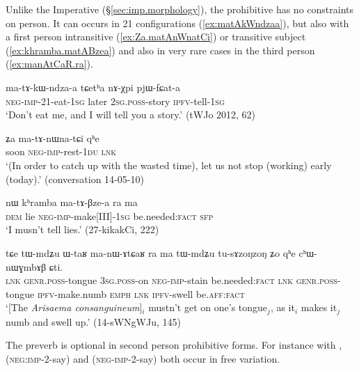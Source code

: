 Unlike the Imperative (§\ref{sec:imp.morphology}), the prohibitive has no constraints on person. It can occurs in 2\fl{}1 configurations (\ref{ex:matAkWndzaa}), but also with a first person intransitive (\ref{ex:Za.matAnWnatCi}) or transitive subject (\ref{ex:khramba.matABzea}) and also in very rare cases in the third person (\ref{ex:manAtCaR.ra}).

\begin{exe}
\ex  \label{ex:matAkWndzaa}
\gll ma-tɤ-kɯ-ndza-a tɕetʰa nɤ-χpi pjɯ-fɕat-a \\
\textsc{neg}-\textsc{imp}-2\fl{}1-eat-\textsc{1sg} later \textsc{2sg}.\textsc{poss}-story \textsc{ipfv}-tell-\textsc{1sg} \\
\glt `Don't eat me, and I will tell you a story.' (tWJo 2012, 62)
\end{exe}

\begin{exe}
\ex  \label{ex:Za.matAnWnatCi}
\gll ʑa ma-tɤ-nɯna-tɕi qʰe \\
soon \textsc{neg}-\textsc{imp}-rest-\textsc{1du} \textsc{lnk} \\
\glt `(In order to catch up with the wasted time), let us not stop (working) early (today).' (conversation 14-05-10)
\end{exe}

\begin{exe}
\ex  \label{ex:khramba.matABzea}
\gll nɯ kʰramba ma-tɤ-βze-a ra ma \\
\textsc{dem} lie  \textsc{neg}-\textsc{imp}-make[III]-\textsc{1sg} be.needed:\textsc{fact} \textsc{sfp} \\
\glt `I musn't tell lies.' (27-kikakCi, 222)
\end{exe}

\begin{exe}
\ex  \label{ex:manAtCaR.ra}
\gll tɕe tɯ-mdʑu ɯ-taʁ ma-nɯ-ɤtɕaʁ ra ma tɯ-mdʑu tu-sɤzoŋzoŋ ʑo qʰe cʰɯ-nɯɣmbɤβ ɕti. \\
\textsc{lnk} \textsc{genr}.\textsc{poss}-tongue \textsc{3sg}.\textsc{poss}-on \textsc{neg}-\textsc{imp}-stain be.needed:\textsc{fact} \textsc{lnk} \textsc{genr}.\textsc{poss}-tongue \textsc{ipfv}-make.numb \textsc{emph} \textsc{lnk} \textsc{ipfv}-swell be.\textsc{aff}:\textsc{fact} \\
\glt `[The \textit{Arisaema consanguineum}]$_i$ mustn't get on one's tongue$_j$, as it$_i$ makes it$_j$ numb and swell up.' (14-sWNgWJu, 145)
\end{exe}

The preverb is optional in second person prohibitive forms. For instance with ,  (\textsc{neg}:\textsc{imp}-2-say) and  (\textsc{neg}-\textsc{imp}-2-say) both occur in free variation.

